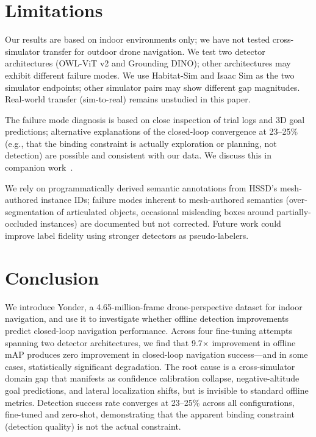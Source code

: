 \documentclass{article}
\begin{document}
\section{Limitations}

Our results are based on indoor environments only; we have not tested cross-simulator transfer for outdoor drone navigation. We test two detector architectures (OWL-ViT v2 and Grounding DINO); other architectures may exhibit different failure modes. We use Habitat-Sim and Isaac Sim as the two simulator endpoints; other simulator pairs may show different gap magnitudes. Real-world transfer (sim-to-real) remains unstudied in this paper.

The failure mode diagnosis is based on close inspection of trial logs and 3D goal predictions; alternative explanations of the closed-loop convergence at 23--25\% (e.g., that the binding constraint is actually exploration or planning, not detection) are possible and consistent with our data. We discuss this in companion work~\cite{anon2026engineering}.

We rely on programmatically derived semantic annotations from HSSD's mesh-authored instance IDs; failure modes inherent to mesh-authored semantics (over-segmentation of articulated objects, occasional misleading boxes around partially-occluded instances) are documented but not corrected. Future work could improve label fidelity using stronger detectors as pseudo-labelers.

\section{Conclusion}

We introduce Yonder, a 4.65-million-frame drone-perspective dataset for indoor navigation, and use it to investigate whether offline detection improvements predict closed-loop navigation performance. Across four fine-tuning attempts spanning two detector architectures, we find that 9.7$\times$ improvement in offline mAP produces zero improvement in closed-loop navigation success---and in some cases, statistically significant degradation. The root cause is a cross-simulator domain gap that manifests as confidence calibration collapse, negative-altitude goal predictions, and lateral localization shifts, but is invisible to standard offline metrics. Detection success rate converges at 23--25\% across all configurations, fine-tuned and zero-shot, demonstrating that the apparent binding constraint (detection quality) is not the actual constraint.
\end{document}
